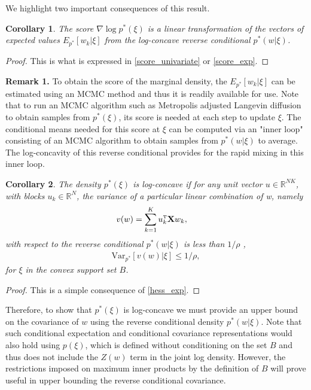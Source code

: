 \documentclass{article}
\numberwithin{equation}{section}
\theoremstyle{Lemma}
\theoremstyle{Corollary}
\newtheorem{corollary}{Corollary}
\theoremstyle{Theorem}
\theoremstyle{Remark}
\newtheorem{remark}{Remark}
\begin{document}
We highlight two important consequences of this result.
\begin{corollary}\label{score_cor}
The score $\nabla \log p^{*}(\xi)$ is a linear transformation of the vectors of expected values $E_{p^{*}}[w_{k}|\xi]$ from the log-concave reverse conditional $p^{*}(w|\xi)$.
\end{corollary}
\begin{proof}
 This is what is expressed in \eqref{score_univariate} or \eqref{score_exp}.
\end{proof}

\noindent \textbf{Remark 1.}
To obtain the score of the marginal density, the $E_{p^{*}}[w_{k}|\xi]$ can be estimated using an MCMC method and thus it is readily available for use. Note that to run an MCMC algorithm such as Metropolis adjusted Langevin diffusion to obtain samples from $p^{*}(\xi)$, its score is needed at each step to update $\xi$.  The conditional means needed for this score at $\xi$ can be computed via  an "inner loop" consisting of an MCMC algorithm to obtain samples from $p^{*}(w|\xi)$ to average. The log-concavity of this reverse conditional provides for the rapid mixing in this inner loop.

\begin{corollary}\label{variance_cor}
    The density $p^{*}(\xi)$ is log-concave if for any unit vector $u \in  \mathbb{R}^{NK}$, with blocks $u_{k} \in \mathbb{R}^{N}$, the variance of a particular linear combination of w, namely
    \begin{align}
        v(w)&= \sum_{k=1}^{K}u_{k}^{\text{\tiny{T}}} \textbf{X}w_{k},
    \end{align}
    with respect to the reverse conditional $p^{*}(w|\xi)$ is less than $1/\rho$ ,
    \begin{align}
        \text{Var}_{p^{*}}[v(w)|\xi]\leq 1/\rho,\label{var_cond}
    \end{align}
    for $\xi$ in the convex support set $B$.
\end{corollary}
\begin{proof}
    This is a simple consequence of \eqref{hess_exp}.
\end{proof}
Therefore, to show that $p^{*}(\xi)$ is log-concave we must provide an upper bound on the covariance of $w$ using the reverse conditional density $p^{*}(w|\xi)$. Note that such conditional expectation and conditional covariance representations would also hold using $p(\xi)$, which is defined without conditioning on the set $B$ and thus does not include the $Z(w)$ term in the joint log density. However, the restrictions imposed on maximum inner products by the definition of $B$ will prove useful in upper bounding the reverse conditional covariance.
\end{document}

